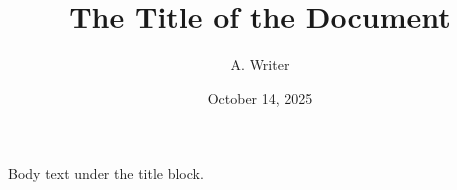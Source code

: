\documentclass{article}
\begin{document}
\title{The Title of the Document}
\author{A. Writer}
\date{October 14, 2025}
\maketitle

Body text under the title block.
\end{document}
